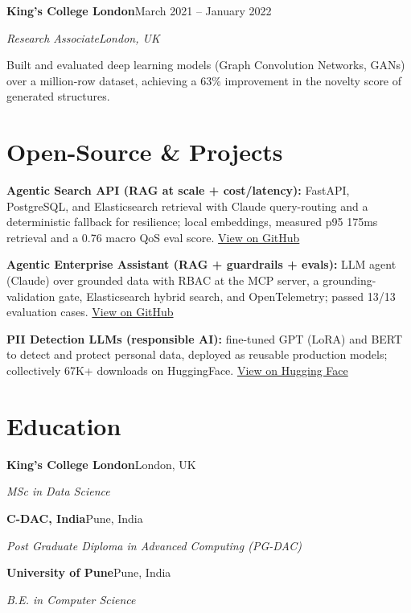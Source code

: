 \documentclass[10pt,a4paper]{article}
\newcommand{\entry}[4]{%
  {\color{company}\bfseries #1}\hfill {\color{muted}#2}\par
  \vspace{1pt}
  {\itshape #3}\hfill {\color{muted}\itshape #4}\par
  \vspace{3pt}%
}
\begin{document}
\entry{King's College London}{March 2021 -- January 2022}{Research Associate}{London, UK}
\begin{tight}
  \item Built and evaluated deep learning models (Graph Convolution Networks, GANs) over a million-row dataset, achieving a 63\% improvement in the novelty score of generated structures.
\end{tight}

\section{Open-Source \& Projects}
\begin{tight}
  \item \textbf{Agentic Search API (RAG at scale + cost/latency):} FastAPI, PostgreSQL, and Elasticsearch retrieval with Claude query-routing and a deterministic fallback for resilience; local embeddings, measured p95 175ms retrieval and a 0.76 macro QoS eval score. \href{https://github.com/abhijeetscode/search-agent}{View on GitHub}
  \item \textbf{Agentic Enterprise Assistant (RAG + guardrails + evals):} LLM agent (Claude) over grounded data with RBAC at the MCP server, a grounding-validation gate, Elasticsearch hybrid search, and OpenTelemetry; passed 13/13 evaluation cases. \href{https://github.com/abhijeetscode/Agentic-Enterprise-Assistant}{View on GitHub}
  \item \textbf{PII Detection LLMs (responsible AI):} fine-tuned GPT (LoRA) and BERT to detect and protect personal data, deployed as reusable production models; collectively 67K+ downloads on HuggingFace. \href{https://huggingface.co/ab-ai/pii_model}{View on Hugging Face}
\end{tight}

\section{Education}
{\color{company}\bfseries King's College London}\hfill {\color{muted}London, UK}\par
{\itshape MSc in Data Science}\par\vspace{2pt}
{\color{company}\bfseries C-DAC, India}\hfill {\color{muted}Pune, India}\par
{\itshape Post Graduate Diploma in Advanced Computing (PG-DAC)}\par\vspace{2pt}
{\color{company}\bfseries University of Pune}\hfill {\color{muted}Pune, India}\par
{\itshape B.E. in Computer Science}\par
\end{document}
